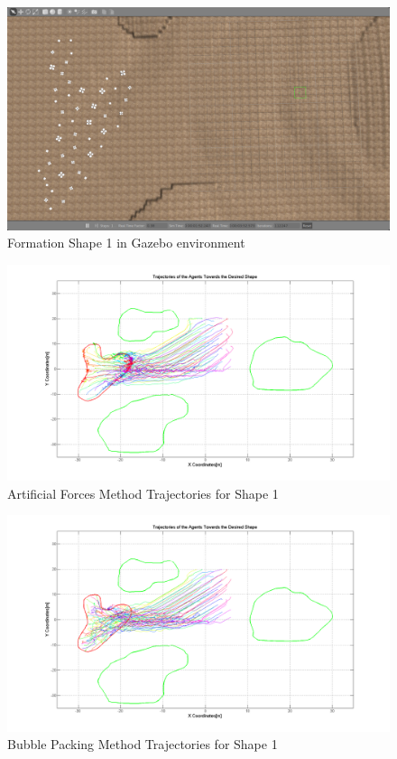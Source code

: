 \begin{figure}[H]
\caption{Formation Shape 1 in Gazebo environment}
\centerline{\includegraphics[scale = 0.35]{Trajectories_Formation_Shape_1_1}}
\end{figure} 	
		
\begin{figure}[H]
\caption{Artificial Forces Method Trajectories for Shape 1}
\centerline{\includegraphics[scale = 0.35]{Aritificial_Trajecories_1}}
\end{figure} 	

\begin{figure}[H]
\caption{Bubble Packing Method Trajectories for Shape 1}
\centerline{\includegraphics[scale = 0.35]{Bubble_Trajectories_1}}
\end{figure} 	
		

